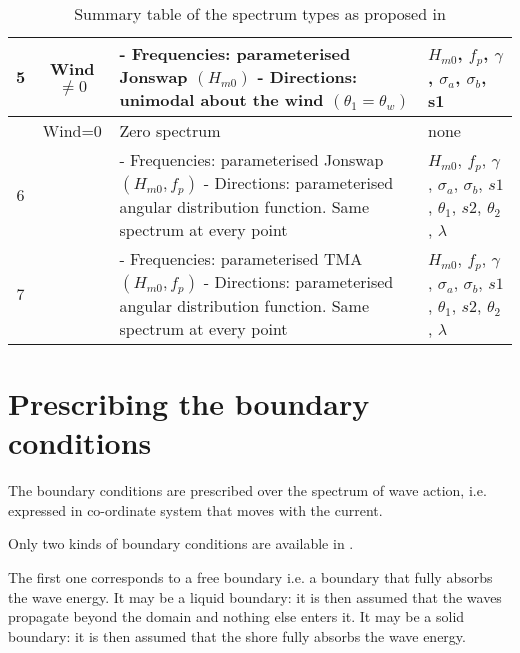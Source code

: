 \begin{table}
\begin{tabular}{|c|c|p{2.2in}|p{1.8in}|}
5 & Wind$\ne 0$ & - Frequencies: parameterised Jonswap $(H_{m0})$ \newline - Directions: unimodal about the wind  $(\theta_1 = \theta_w)$ & $H_{m0}$, $ f_p$, $ \gamma $, $ \sigma_a$, $ \sigma_b$, s1 \\ \hline
 & Wind=0 & Zero spectrum & none \\ \hline
6 &  & - Frequencies: parameterised Jonswap  $(H_{m0}, f_p)$  \newline - Directions: parameterised angular distribution function. Same spectrum at every point& $H_{m0}$, $ f_p$, $ \gamma $, $ \sigma_a$, $ \sigma_b$, $s1$, $ \theta_1$, $ s2$, $ \theta_2$, $ \lambda$ \\ \hline
7 &  & - Frequencies: parameterised TMA $(H_{m0}, f_p)$ \newline - Directions: parameterised angular distribution function. Same spectrum at every point & $H_{m0}$, $ f_p$, $ \gamma $, $ \sigma_a$, $ \sigma_b$, $s1$, $ \theta_1$, $ s2$, $ \theta_2$, $ \lambda$ \\ \hline
\end{tabular}
\caption{\label{tab:Jonswap}Summary table of the spectrum types as proposed in \tomawac}
\end{table}



\section{  Prescribing the boundary conditions}

 The boundary conditions are prescribed over the  spectrum of wave action, i.e. expressed in co-ordinate system that moves with the current.

 Only two kinds of boundary conditions are available in \tomawac.

 The first one corresponds to a free boundary i.e. a boundary that fully absorbs the wave energy. It may be a liquid boundary: it is then assumed that the waves propagate beyond the domain and nothing else enters it. It may be a solid boundary: it is then assumed that the shore fully absorbs the wave energy.

